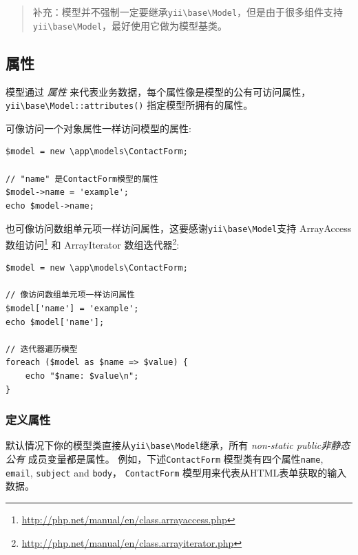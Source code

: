 \begin{quote}补充：模型并不强制一定要继承\texttt{yii{\allowbreak{}\textbackslash}base{\allowbreak{}\textbackslash}Model}，但是由于很多组件支持\texttt{yii{\allowbreak{}\textbackslash}base{\allowbreak{}\textbackslash}Model}，最好使用它做为模型基类。

\end{quote}
\subsection{属性 \label{structure-models.md::attributes}}
模型通过 \textit{属性} 来代表业务数据，每个属性像是模型的公有可访问属性，
\texttt{yii{\allowbreak{}\textbackslash}base{\allowbreak{}\textbackslash}Model\allowbreak{}::\allowbreak{}attributes()} 指定模型所拥有的属性。

可像访问一个对象属性一样访问模型的属性:

\lstset{language=php}\begin{lstlisting}
$model = new \app\models\ContactForm;

// "name" 是ContactForm模型的属性
$model->name = 'example';
echo $model->name;
\end{lstlisting}
也可像访问数组单元项一样访问属性，这要感谢\texttt{yii{\allowbreak{}\textbackslash}base{\allowbreak{}\textbackslash}Model}支持 ArrayAccess 数组访问\footnote{\url{http://php.net/manual/en/class.arrayaccess.php}} 
和 ArrayIterator 数组迭代器\footnote{\url{http://php.net/manual/en/class.arrayiterator.php}}:

\lstset{language=php}\begin{lstlisting}
$model = new \app\models\ContactForm;

// 像访问数组单元项一样访问属性
$model['name'] = 'example';
echo $model['name'];

// 迭代器遍历模型
foreach ($model as $name => $value) {
    echo "$name: $value\n";
}
\end{lstlisting}
\subsubsection{定义属性 \label{structure-models.md::defining-attributes}}
默认情况下你的模型类直接从\texttt{yii{\allowbreak{}\textbackslash}base{\allowbreak{}\textbackslash}Model}继承，所有 \textit{non-static public非静态公有} 成员变量都是属性。
例如，下述\lstinline|ContactForm| 模型类有四个属性\lstinline|name|, \lstinline|email|, \lstinline|subject| and \lstinline|body|，
\lstinline|ContactForm| 模型用来代表从HTML表单获取的输入数据。

